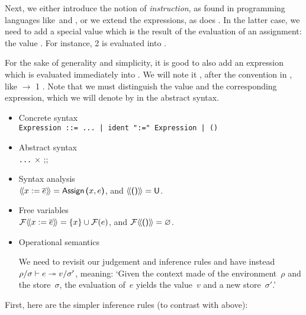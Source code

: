Next, we either introduce the notion of \emph{instruction}, as found
in programming languages like~\Clang and \Java, or we extend the
expressions, as does \OCaml. In the latter case, we need to add a
special value which is the result of the evaluation of an assignment:
the value . For instance,  \assign \num{2} is
evaluated into .

For the sake of generality and simplicity, it is good to also add an
expression which is evaluated immediately into . We will
note it \lpar\rpar, after the convention in \OCaml, like
\Xlet {} \equal \Xfun {} $\rightarrow$ \num{1}
\Xin {} \lpar\rpar. Note that we must distinguish the
value  and the corresponding expression, which we will
denote by  in the abstract syntax.
\begin{itemize}

  \item Concrete syntax\\
\texttt{Expression ::= ... | ident ":=" Expression | ()}

  \item Abstract syntax\\
     \Xtype {} \equal \texttt{...} \vbar {} \Xof
     \(\times\)  \vbar {}\textsf{;;}{} 

  \item Syntax analysis\\
  $\src{x \; \assign \; \meta{e}} = \cst{Assign} \, \lpar{x},
  e\rpar$, and $\langle\!\langle{\textsf{()}}\rangle\!\rangle = \textsf{U}$.

  \item Free variables\\
  $\mathcal{F} \src{x \; \assign \; \meta{e}} = \{x\} \cup \mathcal{F}(e)$,
  and $\mathcal{F}\langle\!\langle{\textsf{(}\textsf{)}}\rangle\!\rangle = \varnothing$.

  \item Operational semantics

  We need to revisit our judgement and inference rules and have
  instead ${\rho}/{\sigma} \vdash {e} \twoheadrightarrow {v}/{\sigma'}$, meaning: `Given the
  context made of the environment~$\rho$ and the store~$\sigma$, the
  evaluation of~$e$ yields the value~$v$ and a new store~$\sigma'$.'

\end{itemize}
First, here are the simpler inference rules (to contrast with 
 above):
